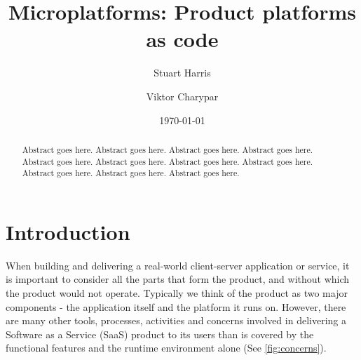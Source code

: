 \documentclass[reprint,amsmath,amssymb,aps]{revtex4-1}
\begin{document}

\title{Microplatforms: Product platforms as code}%

\author{Stuart Harris}
\author{Viktor Charypar}%

\date{\today}%

\begin{abstract}
Abstract goes here. Abstract goes here. Abstract goes here. Abstract goes here. Abstract goes here. 
Abstract goes here. Abstract goes here. Abstract goes here. Abstract goes here. Abstract goes here. Abstract goes here. 
\end{abstract}

\maketitle


\section*{Introduction}
\label{sec:introduction}

When building and delivering a real-world client-server application or service, it is important to consider all the parts that form the product, and without which the product would not operate. Typically we think of the product as two major components - the application itself and the platform it runs on. However, there are many other tools, processes, activities and concerns involved in delivering a Software as a Service (SaaS) product to its users than is covered by the functional features and the runtime environment alone (See \ref{fig:concerns}). 
\end{document}
